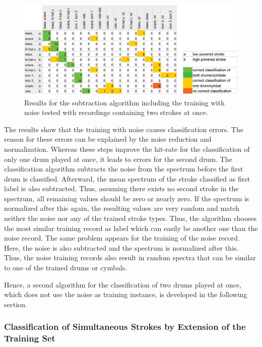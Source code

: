 \begin{figure}[htbp]
	\centering
	\includegraphics[width=.9\textwidth]{images/classification_matrix/multiple1_test_2_multiple.png}
	\caption{Results for the subtraction algorithm including the training with noise tested with recordings containing two strokes at once.}
	\label{fig:multiple13}
\end{figure}


The results show that the training with noise causes classification errors. The reason for these errors can be explained by the noise reduction and normalization. Whereas these steps improve the hit-rate for the classification of only one drum played at once, it leads to errors for the second drum. The classification algorithm subtracts the noise from the spectrum before the first drum is classified. Afterward, the mean spectrum of the stroke classified as first label is also subtracted. Thus, assuming there exists no second stroke in the spectrum, all remaining values should be zero or nearly zero. If the spectrum is normalized after this again, the resulting values are very random and match neither the noise nor any of the trained stroke types. Thus, the algorithm chooses the most similar training record as label which can easily be another one than the noise record. The same problem appears for the training of the noise record. Here, the noise is also subtracted and the spectrum is normalized after this. Thus, the noise training records also result in random spectra that can be similar to one of the trained drums or cymbals. 

Hence, a second algorithm for the classification of two drums played at once, which does not use the noise as training instance, is developed in the following section.

\subsubsection{Classification of Simultaneous Strokes by Extension of the Training Set}

